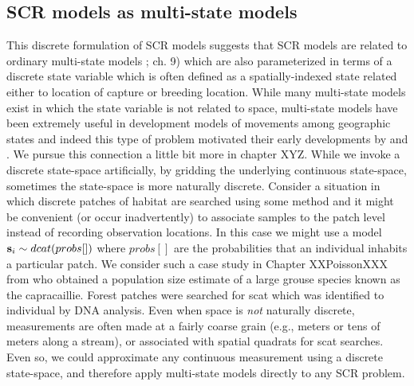 \subsection{SCR models as multi-state models}
This discrete formulation of SCR models suggests that SCR models are
related to ordinary multi-state models \citep{kery_schaub:2011};
ch. 9) which are also parameterized in terms of a discrete state
variable which is often defined as a spatially-indexed state related
either to location of capture or breeding location. While many
multi-state models exist in which the state variable is not related to
space, multi-state models have been extremely useful in development
models of movements among geographic states and indeed this type of
problem motivated their early developments by \citet{arnason:1973,
  arnason:1974} and \citet{hestbeck_etal:1991}.  We pursue this connection a little bit more in chapter XYZ. 
While we invoke a discrete state-space artificially, by gridding the
underlying continuous state-space, sometimes the state-space is more
naturally discrete. Consider a situation in which discrete patches of
habitat are searched using some method and it might be convenient (or
occur inadvertently) to associate samples to the patch level instead
of recording observation locations. In this case we might use a model
${\bf s}_{i} \sim dcat(probs[])$  where $probs[]$ are the probabilities that
an individual inhabits a particular patch. We consider such a case
study in Chapter XXPoissonXXX from \citet{mollet_etal:2012} who
obtained a population size estimate of a large grouse species known as
the capracaillie. Forest patches were searched for scat which was
identified to individual by DNA analysis. Even when space is {\it not}
naturally discrete, measurements are often made at a fairly coarse
grain (e.g., meters or tens of meters along a stream), or associated
with spatial quadrats for scat searches. Even so, we could approximate
any continuous measurement using a discrete state-space, and therefore
apply multi-state models directly to any SCR problem. 


